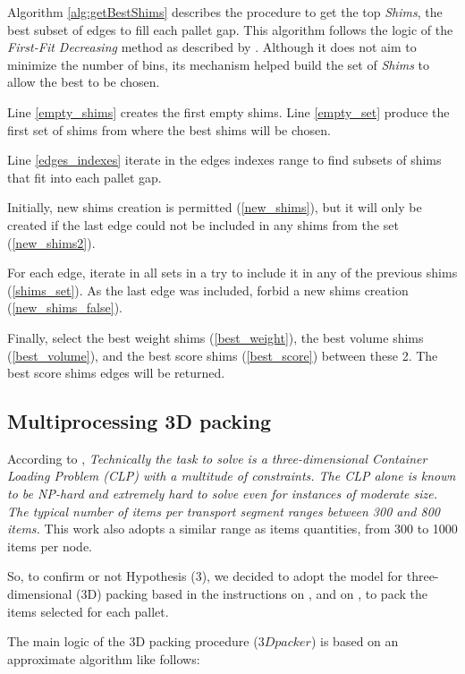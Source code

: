 \documentclass[preprint,authoryear]{elsarticle}
\begin{document}
Algorithm \ref{alg:getBestShims} describes the procedure to get the top {\it Shims}, the best subset of edges to fill each pallet gap. This algorithm follows the logic of the {\it First-Fit Decreasing} method as described by \cite{JohnsonGarey1985}. Although it does not aim to minimize the number of bins, its mechanism helped build the set of {\it Shims} to allow the best to be chosen.

Line \ref{empty_shims} creates the first empty shims.
Line \ref{empty_set} produce the first set of shims from where the best shims will be chosen.

Line \ref{edges_indexes} iterate in the edges indexes range to find subsets of shims that fit into each pallet gap.

Initially, new shims creation is permitted (\ref{new_shims}), but it will only be created if the last edge could not be included in any shims from the set (\ref{new_shims2}). 

For each edge, iterate in all sets in a try to include it in any of the previous shims (\ref{shims_set}).
As the last edge was included, forbid a new shims creation (\ref{new_shims_false}).

Finally, select the best weight shims (\ref{best_weight}), the best volume shims (\ref{best_volume}), and the best score shims (\ref{best_score}) between these 2. The best score shims edges will be returned.


\subsection{Multiprocessing 3D packing}

According to \cite{BrandtStefan2019}, {\it Technically the task to solve is a three-dimensional Container Loading Problem (CLP) with a multitude of constraints. The CLP alone is known to be NP-hard and extremely hard to solve even for instances of moderate size. The typical number of items per transport segment ranges between 300 and 800 items.} This work also adopts a similar range as items quantities, from 300 to 1000 items per node.

So, to confirm or not Hypothesis (3), we decided to adopt the model for three-dimensional (3D) packing based in the instructions on \cite{DubeKanavathy2006}, \cite{li2014} and on \cite{PaquayLimbourgSchynsOliveira2018}, to pack the items selected for each pallet.

The main logic of the 3D packing procedure ($3Dpacker$) is based on an approximate algorithm like follows:
\end{document}
